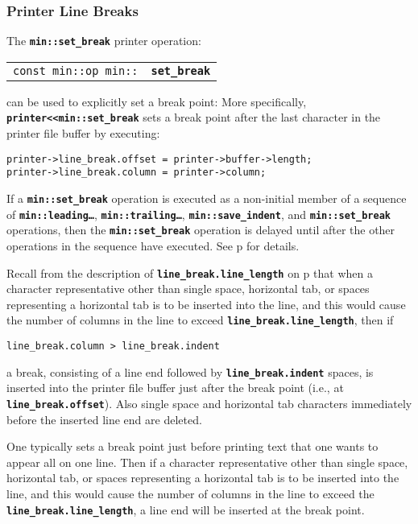 \documentclass[12pt]{article}
\makeatletter
\newcommand{\TT}[1]{{\tt \bfseries #1}}
\newcommand{\ttindex}[1]{\index{#1@{\tt #1}}}
\newcommand{\pagref}[1]{p\pageref{#1}}
\newcommand{\EOL}{\penalty \exhyphenpenalty}
\newenvironment{indpar}[1][0.3in]%
	{\begin{list}{}%
		     {\setlength{\itemsep}{0in}%
		      \setlength{\topsep}{0in}%
		      \setlength{\parsep}{1ex}%
		      \setlength{\labelwidth}{#1}%
		      \setlength{\leftmargin}{#1}%
		      \addtolength{\leftmargin}{\labelsep}}%
	 \item}%
	{\end{list}}
\newcommand{\LABEL}[1]{\label{#1}}
\newcommand{\MINKEY}[1]%
	   {\TT{#1}\ttindex{min::#1}\ttindex{#1}}
\makeatother
\begin{document}
\subsubsection{Printer Line Breaks}
\label{PRINTER-LINE-BREAKS}

The \TT{min::set\_\EOL break} printer operation:

\begin{indpar}[1em]\begin{tabular}{r@{}l}
\verb|const min::op min::| & \MINKEY{set\_\EOL break}
\LABEL{MIN::SET_BREAK} \\
\end{tabular}\end{indpar}

can be used to explicitly set a break point:
More specifically, \TT{printer<{}<min::set\_\EOL break} sets a break point after
the last character in the printer file buffer by executing:
\begin{indpar}\begin{verbatim}
printer->line_break.offset = printer->buffer->length;
printer->line_break.column = printer->column;
\end{verbatim}\end{indpar}

If a \TT{min::set\_break} operation is executed as a non-initial
member of a sequence of
\TT{min::\EOL leading\ldots},
\TT{min::\EOL trailing\ldots},
\TT{min::\EOL save\_\EOL indent},
and \TT{min::\EOL set\_\EOL break} operations, then the
\TT{min::\EOL set\_\EOL break} operation is delayed until
after the other operations in the sequence have executed.  See
\pagref{LEADING-TRAILING-SET-BREAK} for details.

Recall from the description of \TT{line\_\EOL break.line\_\EOL length} on
\pagref{LINE-LENGTH}
that when a character representative other than single space, horizontal
tab, or spaces representing a horizontal tab
is to be inserted into the line, and this would cause the number
of columns in the line to exceed \TT{line\_\EOL break.line\_\EOL length},
then if
\begin{center}
\tt line\_break.column > line\_break.indent
\end{center}
a break, consisting of a line end followed by \TT{line\_\EOL break.indent}
spaces,
is inserted into the printer file buffer just after the break point
(i.e., at \TT{line\_\EOL break.offset}).  Also
single space and horizontal tab
characters immediately before the inserted line end are deleted.

One typically sets a break point just before printing text that one wants
to appear all on one line.  Then if
a character representative other than single space, horizontal
tab, or spaces representing a horizontal tab
is to be inserted into the line, and this would cause the number
of columns in the line to exceed the \TT{line\_\EOL break.line\_\EOL length},
a line end will be inserted at the break point.
\end{document}
